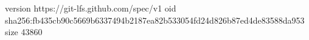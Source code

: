 version https://git-lfs.github.com/spec/v1
oid sha256:fb435cb90c5669b6337494b2187ea82b533054fd24d826b87ed4de83588da953
size 43860
